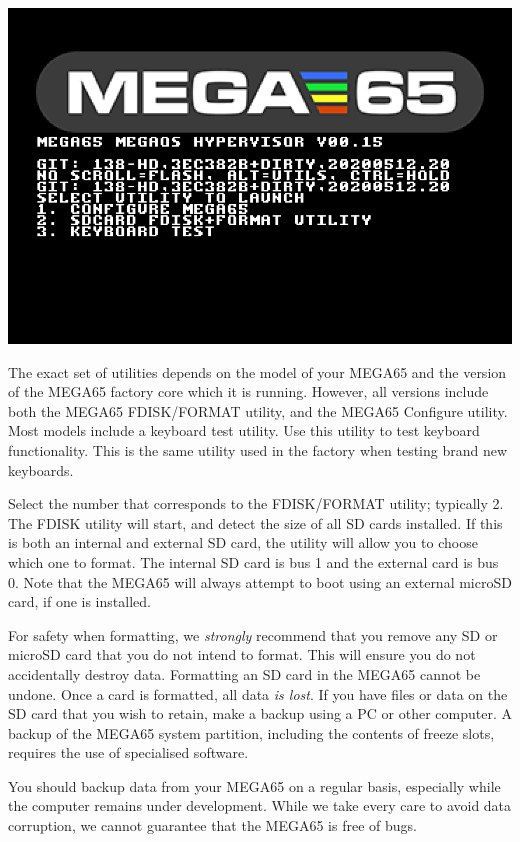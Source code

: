 \includegraphics[width=\linewidth]{images/ss-utilmenu.png}

The exact set of utilities depends on the model of your MEGA65 and the version of the MEGA65 factory core which it is running. However, all versions include both the MEGA65 FDISK/FORMAT utility, and the MEGA65 Configure utility. Most models include a keyboard test utility. Use this utility to test keyboard functionality. This is the same utility used in the factory when testing brand
new keyboards.

Select the number that corresponds to the FDISK/FORMAT utility; typically 2. The FDISK utility will start, and detect the size of all SD cards installed.  If this is both an internal and external SD card, the utility will allow you to
choose which one to format. The internal SD card is bus 1 and the external card is bus 0. Note that the MEGA65 will always attempt to boot using an external microSD card, if one is installed.

For safety when formatting, we {\em strongly} recommend that you remove any SD
or microSD card that you do not intend to format. This will ensure you do
not accidentally destroy data. Formatting an SD card in the MEGA65 cannot be undone. Once a card is formatted, all data {\em is lost}. If you have files or data on the SD card that you wish to retain, make a backup using a PC or other computer. A backup of the MEGA65 system partition, including the contents of freeze slots, requires the use of specialised software.


You should backup data from your MEGA65 on a regular basis, especially while the computer remains under development.  While we take every care to avoid data corruption, we cannot guarantee that the MEGA65 is free of bugs.

